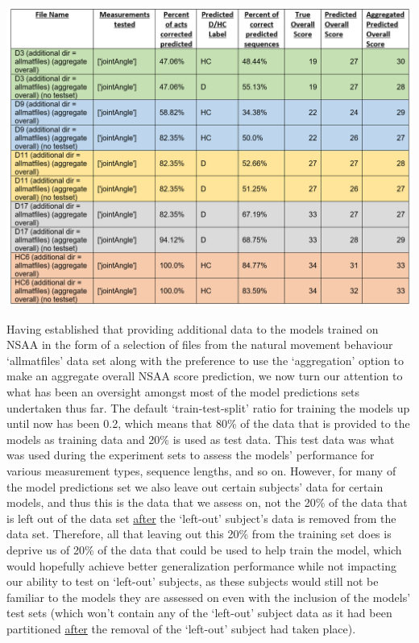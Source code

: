 \documentclass[12pt,twoside]{report}
\begin{document}
\begin{center}
\includegraphics[scale=0.5]{project_figures/fig11_26}
\end{center}

\quad Having established that providing additional data to the models trained on NSAA in the form of a selection of files from the natural movement behaviour ‘allmatfiles’ data set along with the preference to use the ‘aggregation’ option to make an aggregate overall NSAA score prediction, we now turn our attention to what has been an oversight amongst most of the model predictions sets undertaken thus far. The default ‘train-test-split’ ratio for training the models up until now has been 0.2, which means that 80\% of the data that is provided to the models as training data and 20\% is used as test data. This test data was what was used during the experiment sets to assess the models’ performance for various measurement types, sequence lengths, and so on. However, for many of the model predictions set we also leave out certain subjects’ data for certain models, and thus this is the data that we assess on, not the 20\% of the data that is left out of the data set \underline{after} the ‘left-out’ subject’s data is removed from the data set. Therefore, all that leaving out this 20\% from the training set does is deprive us of 20\% of the data that could be used to help train the model, which would hopefully achieve better generalization performance while not impacting our ability to test on ‘left-out’ subjects, as these subjects would still not be familiar to the models they are assessed on even with the inclusion of the models’ test sets (which won’t contain any of the ‘left-out’ subject data as it had been partitioned \underline{after} the removal of the ‘left-out’ subject had taken place).\\
\end{document}
